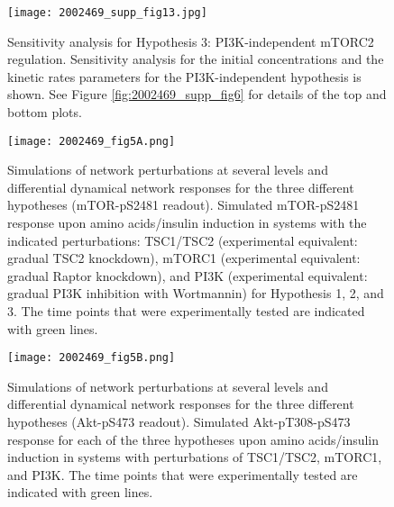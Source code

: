\begin{figure}[tb]
	\begin{center}
		\texttt{[image: 2002469\_supp\_fig13.jpg]}
		\caption[Sensitivity analysis for Hypothesis 3: PI3K-independent mTORC2 regulation]{Sensitivity analysis for Hypothesis 3: PI3K-independent mTORC2 regulation. Sensitivity analysis for the initial concentrations and the kinetic rates parameters for the PI3K-independent hypothesis is shown. See Figure \ref{fig:2002469_supp_fig6} for details of the top and bottom plots.}
		\label{fig:2002469_supp_fig13}
	\end{center}
\end{figure}
\clearpage

\begin{figure}[tb]
	\begin{center}
		\texttt{[image: 2002469\_fig5A.png]}
		\caption[Simulations of network perturbations at several levels and differential dynamical network responses for the three different hypotheses (mTOR-pS2481 readout)]{Simulations of network perturbations at several levels and differential dynamical network responses for the three different hypotheses (mTOR-pS2481 readout). Simulated mTOR-pS2481 response upon amino acids/insulin induction in systems with the indicated perturbations: TSC1/TSC2 (experimental equivalent: gradual TSC2 knockdown), mTORC1 (experimental equivalent: gradual Raptor knockdown), and PI3K (experimental equivalent: gradual PI3K inhibition with Wortmannin) for Hypothesis 1, 2, and 3. The time points that were experimentally tested are indicated with green lines.}
		\label{fig:2002469_fig5A}
	\end{center}
\end{figure}

\clearpage
\begin{figure}[tb]
	\begin{center}
		\texttt{[image: 2002469\_fig5B.png]}
		\caption[Simulations of network perturbations at several levels and differential dynamical network responses for the three different hypotheses (Akt-pS473 readout)]{Simulations of network perturbations at several levels and differential dynamical network responses for the three different hypotheses (Akt-pS473 readout). Simulated Akt-pT308-pS473 response for each of the three hypotheses upon amino acids/insulin induction in systems with perturbations of TSC1/TSC2, mTORC1, and PI3K. The time points that were experimentally tested are indicated with green lines.}
		\label{fig:2002469_fig5B}
	\end{center}
\end{figure}
\clearpage

